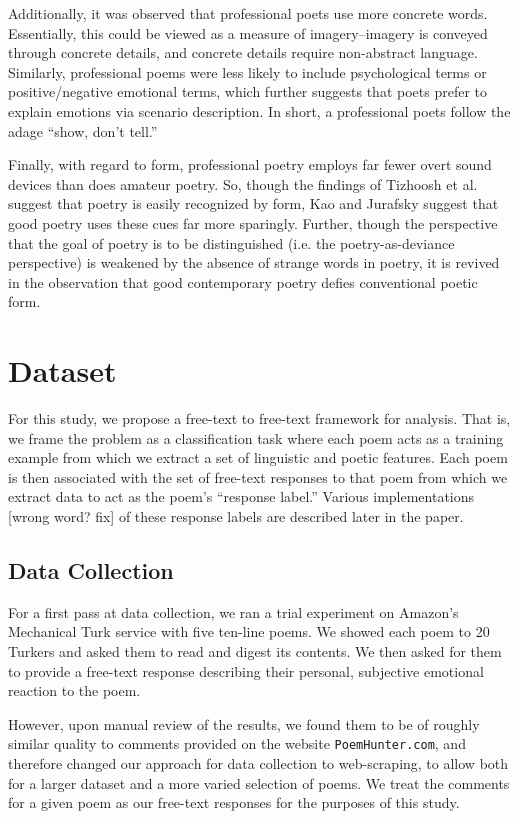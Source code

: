 \documentclass[11pt]{article}
\begin{document}
Additionally, it was observed that professional poets use more concrete words. Essentially, this could be viewed as a measure of imagery--imagery is conveyed through concrete details, and concrete details require non-abstract language. Similarly, professional poems were less likely to include psychological terms or positive/negative emotional terms, which further suggests that poets prefer to explain emotions via scenario description. In short, a professional poets follow the adage ``show, don’t tell.''

Finally, with regard to form, professional poetry employs far fewer overt sound devices than does amateur poetry. So, though the findings of Tizhoosh et al. suggest that poetry is easily recognized by form, Kao and Jurafsky suggest that good poetry uses these cues far more sparingly. Further, though the perspective that the goal of poetry is to be distinguished (i.e. the poetry-as-deviance perspective) is weakened by the absence of strange words in poetry, it is revived in the observation that good contemporary poetry defies conventional poetic form.

\section{Dataset}
For this study, we propose a free-text to free-text framework for analysis. That is, we frame the problem as a classification task where each poem acts as a training example from which we extract a set of linguistic and poetic features. Each poem is then associated with the set of free-text responses to that poem from which we extract data to act as the poem's ``response label.'' Various implementations [wrong word? fix] of these response labels are described later in the paper.

\subsection*{Data Collection}
For a first pass at data collection, we ran a trial experiment on Amazon's Mechanical Turk service with five ten-line poems. We showed each poem to 20 Turkers and asked them to read and digest its contents. We then asked for them to provide a free-text response describing their personal, subjective emotional reaction to the poem. 

However, upon manual review of the results, we found them to be of roughly similar quality to comments provided on the website \texttt{PoemHunter.com}, and therefore changed our approach for data collection to web-scraping, to allow both for a larger dataset and a more varied selection of poems. We treat the comments for a given poem as our free-text responses for the purposes of this study.
\end{document}
